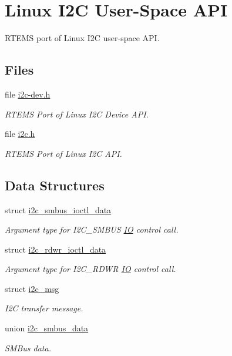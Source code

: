 \hypertarget{group__I2CLinux}{}\section{Linux I2C User-\/\+Space A\+PI}
\label{group__I2CLinux}


R\+T\+E\+MS port of Linux I2C user-\/space A\+PI.  


\subsection*{Files}
\begin{DoxyCompactItemize}
\item 
file \mbox{\hyperlink{i2c-dev_8h}{i2c-\/dev.\+h}}
\begin{DoxyCompactList}\small\item\em R\+T\+E\+MS Port of Linux I2C Device A\+PI. \end{DoxyCompactList}\item 
file \mbox{\hyperlink{cpukit_2include_2linux_2i2c_8h}{i2c.\+h}}
\begin{DoxyCompactList}\small\item\em R\+T\+E\+MS Port of Linux I2C A\+PI. \end{DoxyCompactList}\end{DoxyCompactItemize}
\subsection*{Data Structures}
\begin{DoxyCompactItemize}
\item 
struct \mbox{\hyperlink{structi2c__smbus__ioctl__data}{i2c\+\_\+smbus\+\_\+ioctl\+\_\+data}}
\begin{DoxyCompactList}\small\item\em Argument type for I2\+C\+\_\+\+S\+M\+B\+US \mbox{\hyperlink{structIO}{IO}} control call. \end{DoxyCompactList}\item 
struct \mbox{\hyperlink{structi2c__rdwr__ioctl__data}{i2c\+\_\+rdwr\+\_\+ioctl\+\_\+data}}
\begin{DoxyCompactList}\small\item\em Argument type for I2\+C\+\_\+\+R\+D\+WR \mbox{\hyperlink{structIO}{IO}} control call. \end{DoxyCompactList}\item 
struct \mbox{\hyperlink{structi2c__msg}{i2c\+\_\+msg}}
\begin{DoxyCompactList}\small\item\em I2C transfer message. \end{DoxyCompactList}\item 
union \mbox{\hyperlink{unioni2c__smbus__data}{i2c\+\_\+smbus\+\_\+data}}
\begin{DoxyCompactList}\small\item\em S\+M\+Bus data. \end{DoxyCompactList}\end{DoxyCompactItemize}
